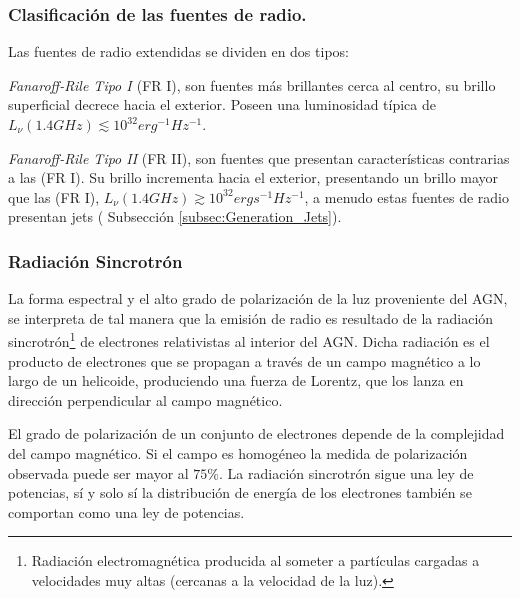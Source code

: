	\subsubsection{Clasificación de las fuentes de radio.}
	\label{subsubsec: clasification_source_radio}

Las fuentes de radio extendidas se dividen en dos tipos:

{\it{Fanaroff-Rile Tipo I }} (FR I), son fuentes más brillantes cerca al centro, su brillo superficial decrece hacia el exterior. Poseen una luminosidad típica de $L_{\nu}(1.4GHz)\lesssim 10^{32} erg^{-1} Hz^{-1}$.

{\it{Fanaroff-Rile Tipo II}} (FR II), son fuentes que presentan características contrarias a las (FR I). Su brillo incrementa hacia el exterior, presentando un brillo mayor que las (FR I), $L_{\nu}(1.4GHz)\gtrsim 10^{32} ergs^{-1}Hz^{-1}$, a menudo estas fuentes de radio presentan jets ( Subsección \ref{subsec:Generation_Jets}).



	\subsubsection{Radiación Sincrotrón}
	\label{subsubsec: Radiation_synchrotron}

La forma espectral y el alto grado de polarización de la luz proveniente del AGN, se interpreta de tal manera que  la emisión de radio es resultado de la radiación sincrotrón\footnote{Radiación electromagnética producida al someter a partículas cargadas a velocidades muy altas (cercanas a la velocidad de la luz).} de electrones relativistas al interior del AGN.
Dicha radiación es  el producto de electrones que se propagan a través de un campo magnético a lo largo de un helicoide, produciendo una fuerza de Lorentz, que los lanza en dirección perpendicular al campo magnético. 

El grado de polarización de un conjunto de electrones depende de la complejidad del campo magnético. Si el campo es homogéneo la medida de polarización observada puede ser mayor al $75\%$. La radiación sincrotrón sigue una ley de potencias, sí y solo sí  la distribución de energía de los electrones también se comportan como una ley de potencias. 


